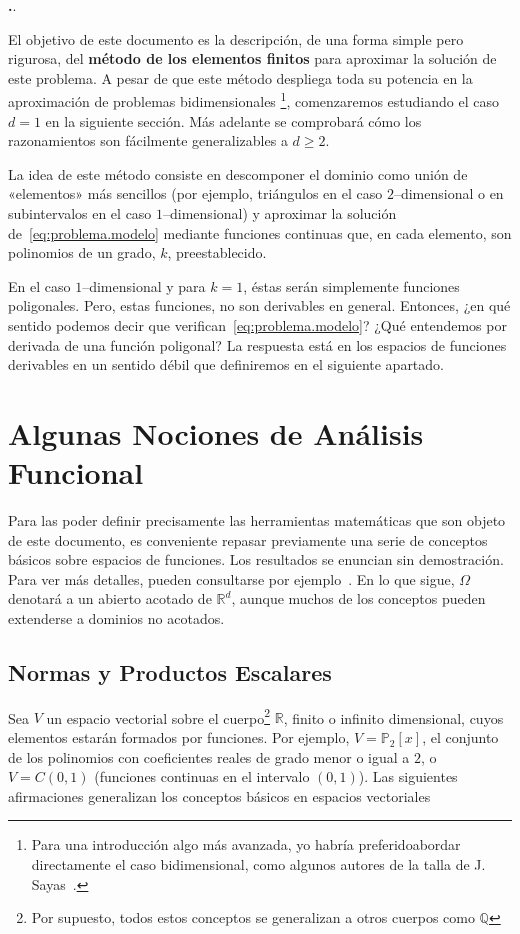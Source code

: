 \documentclass[11pt]{article}
\theoremstyle{plain}
\theoremstyle{definition}
\newcounter{stepnum}[section]
\newcommand{\step}[1][]{\bigskip\noindent\textbf{\thesection.\refstepcounter{stepnum}\thestepnum}.\enspace{#1}}
\newcommand{\Q}{\ensuremath{\mathbb{Q}}}
\newcommand{\R}{\ensuremath{\mathbb{R}}}
\renewcommand{\P}{\ensuremath{\mathbb{P}}}
\begin{document}
\step

El objetivo de este documento es la descripción,  de una forma simple pero rigurosa, del \textbf{método de los elementos finitos} para aproximar la solución de este problema. 
A pesar de que este método despliega toda su potencia en la aproximación de problemas bidimensionales%
\footnote{Para una introducción algo más avanzada, yo habría preferidoabordar directamente el caso bidimensional, como algunos autores de la talla de J. Sayas~\cite{sayas2008gentle}.}, %
comenzaremos estudiando el caso $d=1$ en la siguiente sección. Más adelante se comprobará cómo los razonamientos son fácilmente generalizables  a $d\geq 2$.

La idea de este método consiste en descomponer el dominio como unión de «elementos» más sencillos (por ejemplo, triángulos en el caso $2$--dimensional o en subintervalos en el caso $1$--dimensional) y aproximar la solución de~\eqref{eq:problema.modelo} mediante funciones continuas que, en cada elemento, son polinomios de un grado, $k$, preestablecido. 

En el caso $1$--dimensional y para $k=1$, éstas serán simplemente funciones poligonales. Pero, estas funciones, no son derivables en general. Entonces, ¿en qué sentido podemos decir que verifican~\eqref{eq:problema.modelo}? ¿Qué entendemos por derivada de una función poligonal? La respuesta está en los espacios de funciones derivables en un sentido débil que definiremos en el siguiente apartado.

\section{Algunas Nociones de Análisis Funcional}
\label{sec:análisis.funcional}

Para las poder definir precisamente las herramientas matemáticas que son objeto de este documento, es conveniente repasar previamente una serie de conceptos básicos sobre espacios de funciones. Los resultados se enuncian sin demostración. Para ver más detalles, pueden consultarse por ejemplo~\cite{adams2003sobolev, sayas2019variational}. En lo que sigue, $\Omega$ denotará a un abierto acotado de $\R^d$, aunque muchos de los conceptos pueden extenderse a dominios no acotados.

\subsection*{Normas y Productos Escalares}
Sea $V$ un espacio vectorial sobre el cuerpo\footnote{Por supuesto, todos estos conceptos se generalizan a otros cuerpos como $\Q$} $\R$, finito o infinito dimensional, cuyos elementos estarán formados por funciones. Por ejemplo, $V=\P_2[x]$, el conjunto de los polinomios con coeficientes reales de grado menor o igual a $2$, o $V=C(0,1)$ (funciones continuas en el intervalo $(0,1)$). Las siguientes afirmaciones generalizan los conceptos básicos en espacios vectoriales  
\end{document}
